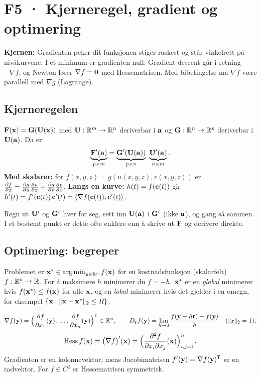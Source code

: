 \section{F5 · Kjerneregel, gradient og optimering}

\textbf{Kjernen:} Gradienten peker dit funksjonen stiger raskest og står vinkelrett på nivåkurvene. I et minimum er gradienten null. Gradient descent går i retning $-\nabla f$, og Newton løser $\nabla f=\mathbf{0}$ med Hessematrisen. Med bibetingelse må $\nabla f$ være parallell med $\nabla g$ (Lagrange).

\subsection{Kjerneregelen}
\begin{teorem}[kjerneregelen]
$\mathbf{F}(\mathbf{x})=\mathbf{G}(\mathbf{U}(\mathbf{x}))$ med $\mathbf{U}:\mathbb{R}^m\to\mathbb{R}^n$ deriverbar i $\mathbf{a}$ og $\mathbf{G}:\mathbb{R}^n\to\mathbb{R}^p$ deriverbar i $\mathbf{U}(\mathbf{a})$. Da er
\[
\underbrace{\mathbf{F}'(\mathbf{a})}_{p\times m}=\underbrace{\mathbf{G}'(\mathbf{U}(\mathbf{a}))}_{p\times n}\ \underbrace{\mathbf{U}'(\mathbf{a})}_{n\times m}.
\]
\textbf{Med skalarer:} for $f(x,y,z)=g(u(x,y,z),v(x,y,z))$ er $\frac{\partial f}{\partial x}=\frac{\partial g}{\partial u}\frac{\partial u}{\partial x}+\frac{\partial g}{\partial v}\frac{\partial v}{\partial x}$.
\textbf{Langs en kurve:} $h(t)=f(\mathbf{c}(t))$ gir $h'(t)=f'(\mathbf{c}(t))\,\mathbf{c}'(t)=\langle \nabla f(\mathbf{c}(t)),\mathbf{c}'(t)\rangle$.
\end{teorem}
\begin{fallgruve}[øving 5]
Regn ut $\mathbf{U}'$ og $\mathbf{G}'$ hver for seg, sett inn $\mathbf{U}(\mathbf{a})$ i $\mathbf{G}'$ (ikke $\mathbf{a}$), og gang så sammen. I et bestemt punkt er dette ofte enklere enn å skrive ut $\mathbf{F}$ og derivere direkte.
\end{fallgruve}

\subsection{Optimering: begreper}
\begin{defn}[minimerer]
Problemet er $\mathbf{x}^*\in\operatorname*{arg\,min}_{\mathbf{x}\in\mathbb{R}^n}f(\mathbf{x})$ for en kostnadsfunksjon (skalarfelt) $f:\mathbb{R}^n\to\mathbb{R}$. For å maksimere $h$ minimerer du $f=-h$. $\mathbf{x}^*$ er en \emph{global} minimerer hvis $f(\mathbf{x}^*)\le f(\mathbf{x})$ for alle $\mathbf{x}$, og en \emph{lokal} minimerer hvis det gjelder i en omegn, for eksempel $\{\mathbf{x}:\lVert \mathbf{x}-\mathbf{x}^*\rVert_2\le R\}$.
\end{defn}

\begin{defn}
\[
\nabla f(\mathbf{y})=\Bigl(\frac{\partial f}{\partial x_1}(\mathbf{y}),\dots,\frac{\partial f}{\partial x_n}(\mathbf{y})\Bigr)^{\mathsf{T}}\in\mathbb{R}^n,\qquad
D_{\mathbf{r}}f(\mathbf{y})=\lim_{h\to0}\frac{f(\mathbf{y}+h\mathbf{r})-f(\mathbf{y})}{h}\quad(\lVert \mathbf{r}\rVert_2=1),
\]
\[
\operatorname{Hess} f(\mathbf{x})=\bigl(\nabla f\bigr)'(\mathbf{x})=\Bigl(\frac{\partial^2f}{\partial x_i\partial x_j}(\mathbf{x})\Bigr)_{i,j=1}^n.
\]
Gradienten er en kolonnevektor, mens Jacobimatrisen $f'(\mathbf{y})=\nabla f(\mathbf{y})^{\mathsf{T}}$ er en radvektor. For $f\in C^2$ er Hessematrisen symmetrisk.
\end{defn}

